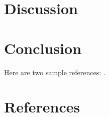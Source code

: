 \documentclass[review]{elsarticle}
\begin{document}
\section{Discussion}

\section{Conclusion}


Here are two sample references: \cite{al2017survivability,azur2011multiple}.

\section*{References}


\end{document}
